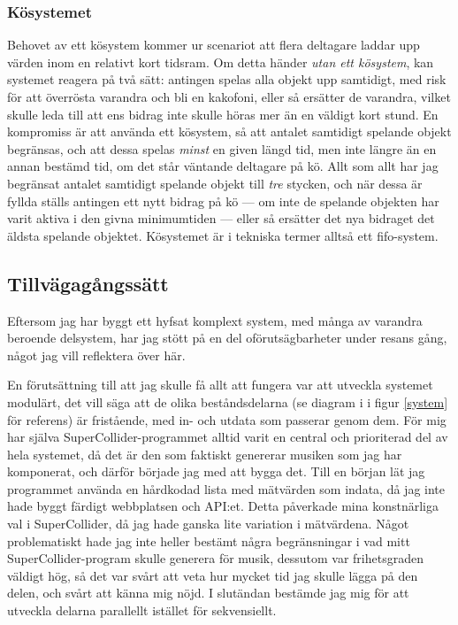 \documentclass[11pt, a4paper]{article} %
\begin{document}
\subsubsection*{Kösystemet}
Behovet av ett kösystem kommer ur scenariot att flera deltagare laddar upp värden inom en relativt kort tidsram. Om detta händer \emph{utan ett kösystem}, kan systemet reagera på två sätt: antingen spelas alla objekt upp samtidigt, med risk för att överrösta varandra och bli en kakofoni, eller så ersätter de varandra, vilket skulle leda till att ens bidrag inte skulle höras mer än en väldigt kort stund. En kompromiss är att använda ett kösystem, så att antalet samtidigt spelande objekt begränsas, och att dessa spelas \emph{minst} en given längd tid, men inte längre än en annan bestämd tid, om det står väntande deltagare på kö. Allt som allt har jag begränsat antalet samtidigt spelande objekt till \emph{tre} stycken, och när dessa är fyllda ställs antingen ett nytt bidrag på kö --- om inte de spelande objekten har varit aktiva i den givna minimumtiden --- eller så ersätter det nya bidraget det äldsta spelande objektet. Kösystemet är i tekniska termer alltså ett \gls{fifo}-system.


\subsection*{Tillvägagångssätt}
Eftersom jag har byggt ett hyfsat komplext system, med många av varandra beroende delsystem, har jag stött på en del oförutsägbarheter under resans gång, något jag vill reflektera över här.

En förutsättning till att jag skulle få allt att fungera var att utveckla systemet modulärt, det vill säga att de olika beståndsdelarna (se diagram i i figur \ref{system} för referens) är fristående, med in- och utdata som passerar genom dem. För mig har själva SuperCollider-programmet alltid varit en central och prioriterad del av hela systemet, då det är den som faktiskt genererar musiken som jag har komponerat, och därför började jag med att bygga det. Till en början lät jag programmet använda en hårdkodad lista med mätvärden som indata, då jag inte hade byggt färdigt webbplatsen och API:et. Detta påverkade mina konstnärliga val i SuperCollider, då jag hade ganska lite variation i mätvärdena. Något problematiskt hade jag inte heller bestämt några begränsningar i vad mitt SuperCollider-program skulle generera för musik, dessutom var frihetsgraden väldigt hög, så det var svårt att veta hur mycket tid jag skulle lägga på den delen, och svårt att känna mig nöjd. I slutändan bestämde jag mig för att utveckla delarna parallellt istället för sekvensiellt.
\end{document}
